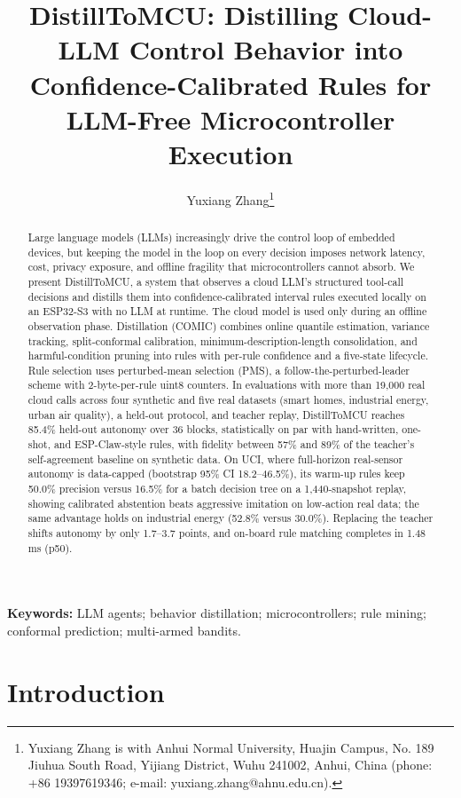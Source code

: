 \documentclass[11pt,a4paper]{article}
\title{DistillToMCU: Distilling Cloud-LLM Control Behavior into
Confidence-Calibrated Rules for LLM-Free Microcontroller Execution}
\author{Yuxiang Zhang\thanks{Yuxiang Zhang is with Anhui Normal University,
Huajin Campus, No. 189 Jiuhua South Road, Yijiang District, Wuhu 241002,
Anhui, China (phone: +86 19397619346; e-mail: yuxiang.zhang@ahnu.edu.cn).}}
\date{}
\begin{document}
\maketitle

\begin{abstract}
Large language models (LLMs) increasingly drive the control loop of embedded
devices, but keeping the model in the loop on every decision imposes network
latency, cost, privacy exposure, and offline fragility that microcontrollers
cannot absorb. We present DistillToMCU, a system that observes a cloud LLM's
structured tool-call decisions and distills them into confidence-calibrated
interval rules executed locally on an ESP32-S3 with no LLM at runtime.
The cloud model is used only during an offline observation phase.
Distillation (COMIC) combines online quantile estimation, variance tracking,
split-conformal calibration, minimum-description-length consolidation, and
harmful-condition pruning into rules with per-rule confidence and a five-state
lifecycle. Rule selection uses perturbed-mean selection (PMS), a
follow-the-perturbed-leader scheme with 2-byte-per-rule uint8 counters. In
evaluations with more than 19,000 real cloud calls across four synthetic and
five real datasets (smart homes, industrial energy, urban air quality), a
held-out protocol, and teacher replay, DistillToMCU reaches 85.4\% held-out
autonomy over 36 blocks, statistically on par with hand-written, one-shot, and
ESP-Claw-style rules, with fidelity between 57\% and 89\% of the teacher's
self-agreement baseline on synthetic data. On UCI, where full-horizon
real-sensor autonomy is data-capped (bootstrap 95\% CI 18.2--46.5\%), its
warm-up rules keep 50.0\% precision versus 16.5\% for a batch decision tree on
a 1,440-snapshot replay, showing calibrated abstention beats aggressive
imitation on low-action real data; the same advantage holds on industrial
energy (52.8\% versus 30.0\%). Replacing the teacher shifts autonomy by only
1.7--3.7 points, and on-board rule matching completes in 1.48 ms (p50).
\end{abstract}

\noindent\textbf{Keywords:} LLM agents; behavior distillation;
microcontrollers; rule mining; conformal prediction; multi-armed bandits.

\section{Introduction}
\end{document}
